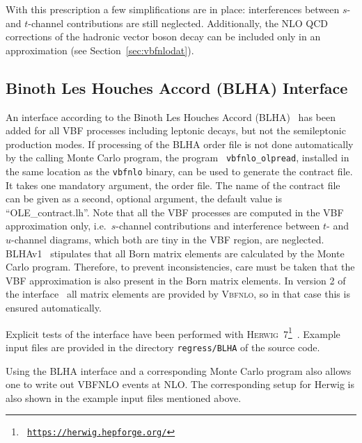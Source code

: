 \documentclass[english,12pt]{article}
\begin{document}
With this prescription a few simplifications are in place: interferences
between $s$- and $t$-channel contributions are still neglected. Additionally,
the NLO QCD corrections of the hadronic vector boson decay can be included only
in an approximation (see Section~\ref{sec:vbfnlodat}).

\subsection{Binoth Les Houches Accord (BLHA) Interface}
\label{sec:blha}
An interface according to the Binoth Les Houches Accord
(BLHA)~\cite{Binoth:2010xt,Alioli:2013nda} has been added for all VBF processes
including leptonic decays, but not the semileptonic production modes. If processing of the BLHA order file is not done
automatically by the calling Monte Carlo program, the program {\tt
vbfnlo\_olpread}, installed in the same location as the {\tt vbfnlo} binary,
can be used to generate the contract file. It takes one mandatory argument, the order file.
The name of the contract file can be given as a second, optional argument, the
default value is ``OLE\_contract.lh''.
Note that all the VBF processes are computed in the VBF approximation only,
i.e.\ $s$-channel contributions and interference between $t$- and $u$-channel
diagrams, which both are tiny in the VBF region, are neglected. BLHAv1~\cite{Binoth:2010xt} stipulates that all Born matrix elements are
calculated by the Monte Carlo program. Therefore, to prevent inconsistencies, care must be taken that the VBF approximation is also present in the Born matrix elements. In version 2 of the
interface~\cite{Alioli:2013nda} all matrix elements are provided by
\textsc{Vbfnlo}, so in that case this is ensured automatically.

Explicit tests of the interface have been performed with \textsc{Herwig}~7\footnote{\tt
\url{https://herwig.hepforge.org/}}~\cite{Bellm:2015jjp}.
Example input files are provided in the directory {\tt regress/BLHA} of the source code.

Using the BLHA interface and a corresponding Monte Carlo program also allows
one to write out VBFNLO events at NLO. The corresponding setup for Herwig is
also shown in the example input files mentioned above.


\end{document}
